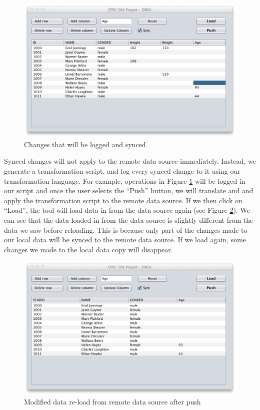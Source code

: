 \documentclass[12pt]{article}
\newcommand{\figref}[1]{Figure \ref{#1}}
\begin{document}
\begin{figure} [!ht]
  \centering
  \includegraphics[width=0.9\columnwidth]{sync}
  \caption{Changes that will be logged and synced}
  \label{fig:sync}
\end{figure}
\newpage
Synced changes will not apply to the remote data source immediately. Instead, we generate a transformation script, and log every synced change to it using our transformation language. For example, operations in \figref{fig:sync} will be logged in our script and once the user selects the ``Push'' button, we will translate and and apply the transformation script to the remote data source. If we then click on ``Load'', the tool will load data in from the data source again (see \figref{fig:push}). We can see that the data loaded in from the data source is slightly different from the data we saw before reloading.  This is because only part of the changes made to our local data will be synced to the remote data source. If we load again, some changes we made to the local data copy will disappear.
\begin{figure} [!ht]
  \centering
  \includegraphics[width=0.9\columnwidth]{push}
  \caption{Modified data re-load from remote data source after push}
  \label{fig:push}
\end{figure}
\end{document}
